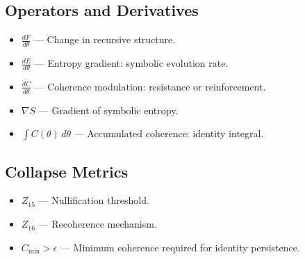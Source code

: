 \documentclass[12pt]{article}
\begin{document}
\subsection*{Operators and Derivatives}
\begin{itemize}
  \item $\frac{dF}{d\theta}$ — Change in recursive structure.
  \item $\frac{dE}{d\theta}$ — Entropy gradient: symbolic evolution rate.
  \item $\frac{dC}{d\theta}$ — Coherence modulation: resistance or reinforcement.
  \item $\nabla S$ — Gradient of symbolic entropy.
  \item $\int C(\theta) \, d\theta$ — Accumulated coherence: identity integral.
\end{itemize}

\subsection*{Collapse Metrics}
\begin{itemize}
  \item $Z_{15}$ — Nullification threshold.
  \item $Z_{16}$ — Recoherence mechanism.
  \item $C_{\text{min}} > \epsilon$ — Minimum coherence required for identity persistence.
\end{itemize}
\end{document}
